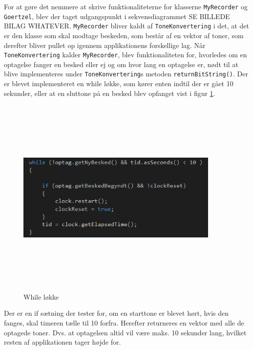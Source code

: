 For at gøre det nemmere at skrive funktionaliteterne for klasserne \texttt{MyRecorder} og \texttt{Goertzel}, blev der taget udgangspunkt i sekvensdiagrammet SE BILLEDE BILAG WHATEVER. 
\newline
\texttt{MyRecorder} bliver kaldt af \texttt{ToneKonvertering} i det, at det er den klasse som skal modtage beskeden, som består af en vektor af toner, som derefter bliver pullet op igennem applikationens forskellige lag.
\newline
Når \texttt{ToneKonvertering} kalder \texttt{MyRecorder}, blev funktionaliteten for, hvorledes om en optagelse fanger en besked eller ej og om hvor lang en optagelse er, nødt til at blive implementeres under \texttt{ToneKonvertering}s metoden \texttt{returnBitString()}.
\newline
Der er blevet implementeret en while løkke, som kører enten indtil der er gået 10 sekunder, eller at en sluttone på en besked blev opfanget vist i  figur \ref{fig:returnbitstrengwhile}.
\begin{figure}[ht]
	\centering
	\includegraphics[width=10cm,height=10cm,keepaspectratio]{pictures/Returnbitstrengwhileloekke.PNG}
	\caption{While løkke}
	\label{fig:returnbitstrengwhile}
\end{figure}
 Der er en if sætning der tester for, om en starttone er blevet hørt, hvis den fanges, skal timeren tælle til 10 forfra. Herefter returneres en vektor med alle de optagede toner. Dvs. at optagelsen altid vil være maks. 10 sekunder lang, hvilket resten af applikationen tager højde for.
\newline
